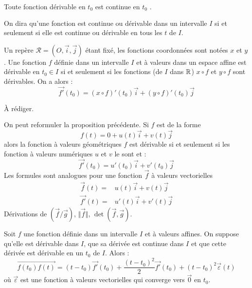 \begin{description}
\begin{prop}
 Toute fonction dérivable en $t_0$ est continue en $t_0$ .
\end{prop}

On dira qu'une fonction est continue ou dérivable dans un intervalle $I$ si et seulement si elle est continue ou dérivable en tous les $t$ de $I$.

\begin{prop}
 Un repère $\mathcal R=(O,\overrightarrow i , \overrightarrow j)$ étant fixé, les fonctions coordonnées sont notées $x$ et $y$. Une fonction $f$ définie dans un intervalle $I$ et à valeurs dans un espace affine est dérivable en $t_0\in I$ si et seulement si les fonctions (de $I$ dans $\mathbb{R}$) $x\circ f$ et $y\circ f$ sont dérivables. On a alors :
\begin{displaymath}
 \overrightarrow{f'}(t_0) = (x\circ f)'(t_0)\overrightarrow i + (y\circ f)'(t_0)\overrightarrow j
\end{displaymath}
\end{prop}
\begin{demo}
 \`A rédiger.
\end{demo}

On peut reformuler la proposition précédente. Si $f$ est de la forme
\begin{displaymath}
 f(t) = 0 +u(t)\overrightarrow i + v(t) \overrightarrow j
\end{displaymath}
alors la fonction à valeurs géométriques $f$ est dérivable si et seulement si les fonction à valeurs numériques $u$ et $v$ le sont et :
\begin{displaymath}
 \overrightarrow{f'}(t_0) = u'(t_0)\overrightarrow i + v'(t_0)\overrightarrow j
\end{displaymath}
Les formules sont analogues pour une fonction $\overrightarrow f$ à valeurs vectorielles
\begin{align*}
 \overrightarrow{f}(t) =& u(t)\overrightarrow i + v(t) \overrightarrow j \\
 \overrightarrow{f'}(t) =& u'(t)\overrightarrow i + v'(t) \overrightarrow j 
\end{align*}
Dérivations de $(\overrightarrow f / \overrightarrow g )$, $\Vert \overrightarrow f \Vert$, $\det(\overrightarrow f, \overrightarrow g)$.
\begin{prop}
Soit $f$ une fonction définie dans un intervalle $I$ et à valeurs affines. On suppose qu'elle est dérivable dans $I$, que sa dérivée est continue dans $I$ et que cette dérivée est dérivable en un $t_0$ de $I$. Alors :
 \begin{displaymath}
 \overrightarrow{f(t_0)f(t)}
= (t-t_0)\overrightarrow{f'}(t_0) + \dfrac{(t-t_0)^2}{2}\overrightarrow{f'}(t_0)
+ (t-t_0)^2 \overrightarrow{\varepsilon}(t)
\end{displaymath}
où $\overrightarrow{\varepsilon}$ est une fonction à valeurs vectorielles qui converge vers $\overrightarrow 0$ en $t_0$. 
\end{prop}

\end{description}


